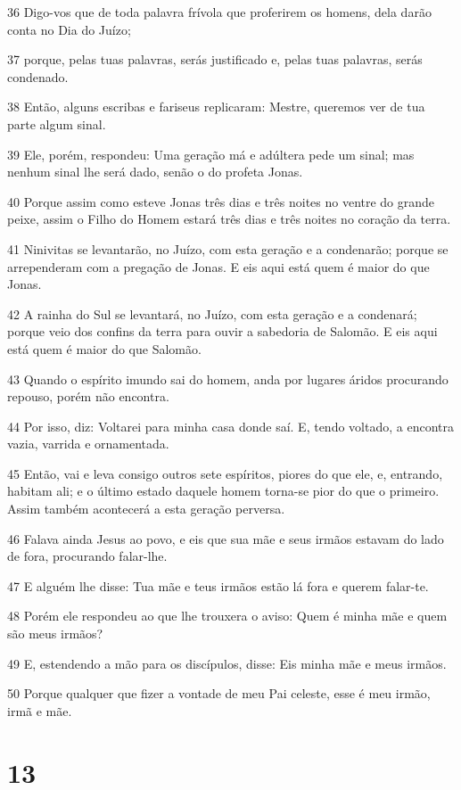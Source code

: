 \par 36 Digo-vos que de toda palavra frívola que proferirem os homens, dela darão conta no Dia do Juízo;
\par 37 porque, pelas tuas palavras, serás justificado e, pelas tuas palavras, serás condenado.
\par 38 Então, alguns escribas e fariseus replicaram: Mestre, queremos ver de tua parte algum sinal.
\par 39 Ele, porém, respondeu: Uma geração má e adúltera pede um sinal; mas nenhum sinal lhe será dado, senão o do profeta Jonas.
\par 40 Porque assim como esteve Jonas três dias e três noites no ventre do grande peixe, assim o Filho do Homem estará três dias e três noites no coração da terra.
\par 41 Ninivitas se levantarão, no Juízo, com esta geração e a condenarão; porque se arrependeram com a pregação de Jonas. E eis aqui está quem é maior do que Jonas.
\par 42 A rainha do Sul se levantará, no Juízo, com esta geração e a condenará; porque veio dos confins da terra para ouvir a sabedoria de Salomão. E eis aqui está quem é maior do que Salomão.
\par 43 Quando o espírito imundo sai do homem, anda por lugares áridos procurando repouso, porém não encontra.
\par 44 Por isso, diz: Voltarei para minha casa donde saí. E, tendo voltado, a encontra vazia, varrida e ornamentada.
\par 45 Então, vai e leva consigo outros sete espíritos, piores do que ele, e, entrando, habitam ali; e o último estado daquele homem torna-se pior do que o primeiro. Assim também acontecerá a esta geração perversa.
\par 46 Falava ainda Jesus ao povo, e eis que sua mãe e seus irmãos estavam do lado de fora, procurando falar-lhe.
\par 47 E alguém lhe disse: Tua mãe e teus irmãos estão lá fora e querem falar-te.
\par 48 Porém ele respondeu ao que lhe trouxera o aviso: Quem é minha mãe e quem são meus irmãos?
\par 49 E, estendendo a mão para os discípulos, disse: Eis minha mãe e meus irmãos.
\par 50 Porque qualquer que fizer a vontade de meu Pai celeste, esse é meu irmão, irmã e mãe.

\chapter{13}


